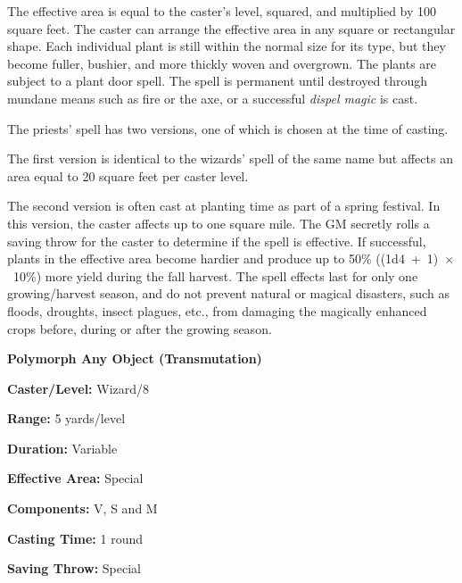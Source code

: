\begin{multicols}{2}
The effective area is equal to the caster's level, squared, and multiplied by 100 square feet.  The caster can arrange the effective area in any square or rectangular shape.  Each individual plant is still within the normal size for its type, but they become fuller, bushier, and more thickly woven and overgrown.  The plants are subject to a plant door spell.  The spell is permanent until destroyed through mundane means such as fire or the axe, or a successful \textit{dispel magic} is cast.

The priests' spell has two versions, one of which is chosen at the time of casting.  

The first version is identical to the wizards' spell of the same name but affects an area equal to 20 square feet per caster level.

The second version is often cast at planting time as part of a spring festival.  In this version, the caster affects up to one square mile.  The GM secretly rolls a saving throw for the caster to determine if the spell is effective.  If successful, plants in the effective area become hardier and produce up to 50\% ((1d4~+~1)~$\times$~10\%) more yield during the fall harvest.  The spell effects last for only one growing/harvest season, and do not prevent natural or magical disasters, such as floods, droughts, insect plagues, etc., from damaging the magically enhanced crops before, during or after the growing season.

\vspace{1em}

\noindent
\begin{minipage}{\columnwidth}

\noindent \textbf{Polymorph Any Object (Transmutation)}

\noindent \textbf{Caster/Level:} Wizard/8

\noindent \textbf{Range:} 5 yards/level

\noindent \textbf{Duration:} Variable

\noindent \textbf{Effective Area:} Special

\noindent \textbf{Components:} V, S and M

\noindent \textbf{Casting Time:} 1 round

\noindent \textbf{Saving Throw:} Special

\end{minipage}


\end{multicols}
